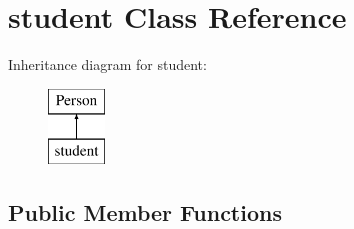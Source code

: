 \hypertarget{classstudent}{}\section{student Class Reference}
\label{classstudent}
Inheritance diagram for student\+:\begin{figure}[H]
\begin{center}
\leavevmode
\includegraphics[height=2.000000cm]{classstudent}
\end{center}
\end{figure}
\subsection*{Public Member Functions}
